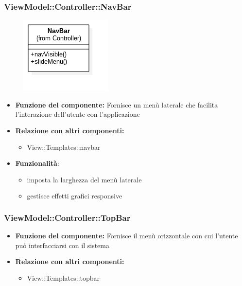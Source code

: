  \subsubsection{ViewModel::Controller::NavBar}
 \begin{figure}[h!]
\begin{center}
	\includegraphics[scale=0.6]{../images/ViewModel/Controller/NavBar.png}
\end{center}
\end{figure}
 \begin{itemize}
 \item\textbf{Funzione del componente:} Fornisce un menù laterale che facilita l'interazione dell'utente con l'applicazione
 \item\textbf{Relazione con altri componenti:}
 \begin{itemize}
 	\item View::Templates::navbar
 \end{itemize}
 \item\textbf{Funzionalità}:
 	\begin{itemize}
 		\item{} imposta la larghezza del menù laterale\\
		\item{} gestisce effetti grafici responsive\\
 	\end{itemize}
 \end{itemize}
\newpage
 
 \subsubsection{ViewModel::Controller::TopBar}
 \begin{itemize}
 \item\textbf{Funzione del componente:} Fornisce il menù orizzontale con cui l'utente può interfacciarsi con il sistema
 \item\textbf{Relazione con altri componenti:}
 \begin{itemize}
 	\item View::Templates::topbar
 \end{itemize}
 \end{itemize}
\newpage
 
